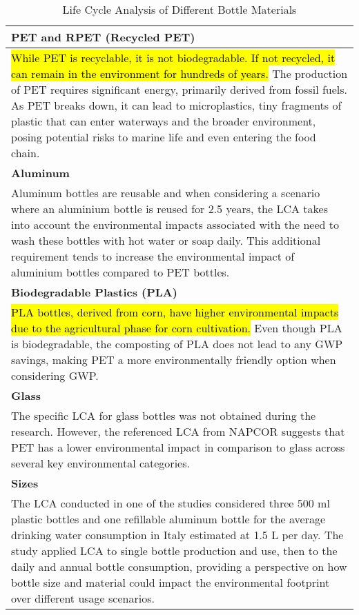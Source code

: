 \documentclass{article}
\begin{document}
\begin{itemize}
\begin{table}[H]
\centering
\caption{Life Cycle Analysis of Different Bottle Materials}
\begin{tabular}{|p{3cm}|p{12cm}|}
\hline
\multicolumn{2}{|p{15cm}|}{\textbf{PET and RPET (Recycled PET)}} \\
\hline
\multicolumn{2}{|p{15cm}|}{\hl{While PET is recyclable, it is not biodegradable. If not recycled, it can remain in the environment for hundreds of years.} The production of PET requires significant energy, primarily derived from fossil fuels. As PET breaks down, it can lead to microplastics, tiny fragments of plastic that can enter waterways and the broader environment, posing potential risks to marine life and even entering the food chain.} \\
\hline
\multicolumn{2}{|p{15cm}|}{\textbf{Aluminum}} \\
\hline
\multicolumn{2}{|p{15cm}|}{Aluminum bottles are reusable and when considering a scenario where an aluminium bottle is reused for 2.5 years, the LCA takes into account the environmental impacts associated with the need to wash these bottles with hot water or soap daily. This additional requirement tends to increase the environmental impact of aluminium bottles compared to PET bottles.} \\
\hline
\multicolumn{2}{|p{15cm}|}{\textbf{Biodegradable Plastics (PLA)}} \\
\hline
\multicolumn{2}{|p{15cm}|}{\hl{PLA bottles, derived from corn, have higher environmental impacts due to the agricultural phase for corn cultivation.} Even though PLA is biodegradable, the composting of PLA does not lead to any GWP savings, making PET a more environmentally friendly option when considering GWP.} \\
\hline
\multicolumn{2}{|p{15cm}|}{\textbf{Glass}} \\
\hline
\multicolumn{2}{|p{15cm}|}{The specific LCA for glass bottles was not obtained during the research. However, the referenced LCA from NAPCOR suggests that PET has a lower environmental impact in comparison to glass across several key environmental categories.} \\
\hline
\multicolumn{2}{|p{15cm}|}{\textbf{Sizes}} \\
\hline
\multicolumn{2}{|p{15cm}|}{The LCA conducted in one of the studies considered three 500 ml plastic bottles and one refillable aluminum bottle for the average drinking water consumption in Italy estimated at 1.5 L per day. The study applied LCA to single bottle production and use, then to the daily and annual bottle consumption, providing a perspective on how bottle size and material could impact the environmental footprint over different usage scenarios.} \\

\end{tabular}
\end{table}
\end{itemize}
\end{document}
